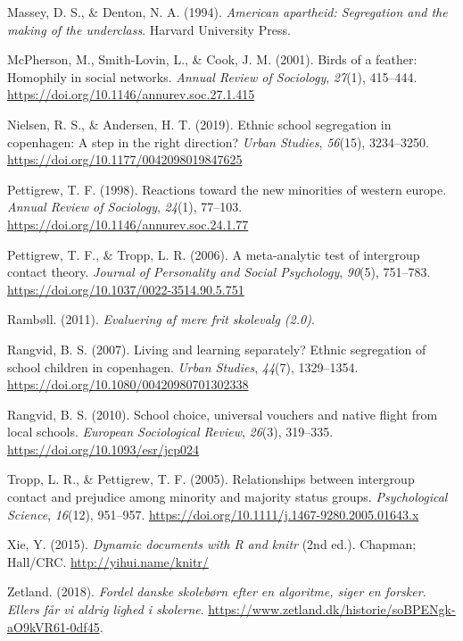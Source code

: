 \documentclass[
]{book}
\newlength{\cslhangindent}
\newenvironment{CSLReferences}[2] %
 {\begin{list}{}{%
  \setlength{\itemindent}{0pt}
  \setlength{\leftmargin}{0pt}
  \setlength{\parsep}{0pt}
  \ifodd #1
   \setlength{\leftmargin}{\cslhangindent}
   \setlength{\itemindent}{-1\cslhangindent}
  \fi
  \setlength{\itemsep}{#2\baselineskip}}}
 {\end{list}}
\begin{document}
\begin{CSLReferences}{1}{0}
Massey, D. S., \& Denton, N. A. (1994). \emph{American apartheid: Segregation and the making of the underclass}. Harvard University Press.

McPherson, M., Smith-Lovin, L., \& Cook, J. M. (2001). Birds of a feather: Homophily in social networks. \emph{Annual Review of Sociology}, \emph{27}(1), 415--444. \url{https://doi.org/10.1146/annurev.soc.27.1.415}

Nielsen, R. S., \& Andersen, H. T. (2019). Ethnic school segregation in copenhagen: A step in the right direction? \emph{Urban Studies}, \emph{56}(15), 3234--3250. \url{https://doi.org/10.1177/0042098019847625}

Pettigrew, T. F. (1998). Reactions toward the new minorities of western europe. \emph{Annual Review of Sociology}, \emph{24}(1), 77--103. \url{https://doi.org/10.1146/annurev.soc.24.1.77}

Pettigrew, T. F., \& Tropp, L. R. (2006). A meta-analytic test of intergroup contact theory. \emph{Journal of Personality and Social Psychology}, \emph{90}(5), 751--783. \url{https://doi.org/10.1037/0022-3514.90.5.751}

Rambøll. (2011). \emph{Evaluering af mere frit skolevalg (2.0)}.

Rangvid, B. S. (2007). Living and learning separately? Ethnic segregation of school children in copenhagen. \emph{Urban Studies}, \emph{44}(7), 1329--1354. \url{https://doi.org/10.1080/00420980701302338}

Rangvid, B. S. (2010). School choice, universal vouchers and native flight from local schools. \emph{European Sociological Review}, \emph{26}(3), 319--335. \url{https://doi.org/10.1093/esr/jcp024}

Tropp, L. R., \& Pettigrew, T. F. (2005). Relationships between intergroup contact and prejudice among minority and majority status groups. \emph{Psychological Science}, \emph{16}(12), 951--957. \url{https://doi.org/10.1111/j.1467-9280.2005.01643.x}

Xie, Y. (2015). \emph{Dynamic documents with {R} and knitr} (2nd ed.). Chapman; Hall/CRC. \url{http://yihui.name/knitr/}

Zetland. (2018). \emph{Fordel danske skolebørn efter en algoritme, siger en forsker. Ellers får vi aldrig lighed i skolerne}. \url{https://www.zetland.dk/historie/soBPENgk-aO9kVR61-0df45}.

\end{CSLReferences}
\end{document}
